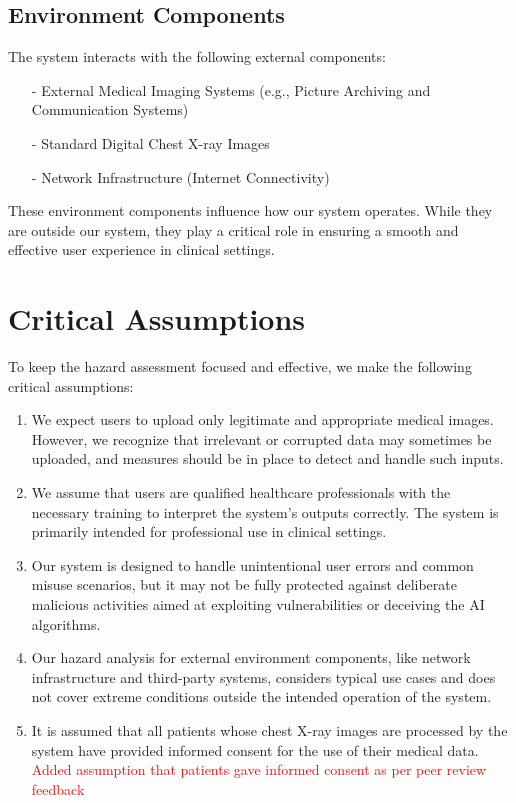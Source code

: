 \documentclass{article}
\begin{document}
\subsection{Environment Components}

The system interacts with the following external components:

\begin{itemize}
    \item[-] External Medical Imaging Systems (e.g., Picture Archiving and Communication Systems)
    \item[-] Standard Digital Chest X-ray Images
    \item[-] Network Infrastructure (Internet Connectivity)
\end{itemize}
These environment components influence how our system operates. While they are outside our system, they play a critical role in ensuring a smooth and effective user experience in clinical settings.

\section{Critical Assumptions}

To keep the hazard assessment focused and effective, we make the following critical assumptions:

\begin{enumerate}
    \item {We expect users to upload only legitimate and appropriate medical images. However, we recognize that irrelevant or corrupted data may sometimes be uploaded, and measures should be in place to detect and handle such inputs.}

    \item {We assume that users are qualified healthcare professionals with the necessary training to interpret the system's outputs correctly. The system is primarily intended for professional use in clinical settings.}
    \item {Our system is designed to handle unintentional user errors and common misuse scenarios, but it may not be fully protected against deliberate malicious activities aimed at exploiting vulnerabilities or deceiving the AI algorithms.}
    \item {Our hazard analysis for external environment components, like network infrastructure and third-party systems, considers typical use cases and does not cover extreme conditions outside the intended operation of the system.}
    \item{It is assumed that all patients whose chest X-ray images are processed by the system have provided informed consent for the use of their medical data. }\\
    \textcolor{red}{Added assumption that patients gave informed consent as per peer review feedback}

\end{enumerate}
\end{document}
